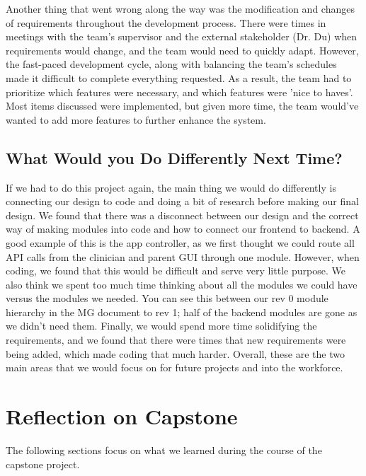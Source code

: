 \documentclass{article}
\begin{document}
Another thing that went wrong along the way was the modification and changes of requirements throughout the development process. There were times in meetings with the team's supervisor and
the external stakeholder (Dr. Du) when requirements would change, and the team would need to quickly adapt. However, the fast-paced development cycle, along with balancing the team's schedules
made it difficult to complete everything requested. As a result, the team had to prioritize which features were necessary, and which features were 'nice to haves'. Most items discussed were implemented,
but given more time, the team would've wanted to add more features to further enhance the system.

\subsection{What Would you Do Differently Next Time?}

\hspace{2em}If we had to do this project again, the main thing we would do differently is connecting our design to code and doing a bit of research before making our final design. 
We found that there was a disconnect between our design and the correct way of making modules into code and how to connect our frontend to backend. A good example of this is 
the app controller, as we first thought we could route all API calls from the clinician and parent GUI through one module. However, when coding, we found that this would be 
difficult and serve very little purpose. We also think we spent too much time thinking about all the modules we could have versus the modules we needed. You can see this between our
rev 0 module hierarchy in the MG document to rev 1; half of the backend modules are gone as we didn't need them. Finally, we would spend more time solidifying the requirements, and we found that 
there were times that new requirements were being added, which made coding that much harder. Overall, these are the two main areas that we would focus on for future projects and into the workforce.

\newpage

\section{Reflection on Capstone}

\hspace{2em} The following sections focus on what we learned during the course of the capstone project.
\end{document}
